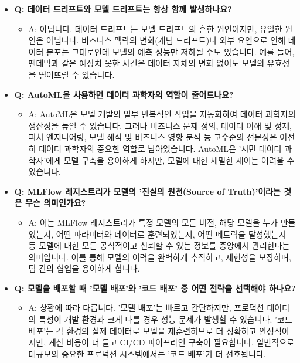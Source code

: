 \documentclass[11pt,a4paper]{article}
\begin{document}
\begin{itemize}
    \item \textbf{Q: 데이터 드리프트와 모델 드리프트는 항상 함께 발생하나요?}
    \begin{itemize}
        \item A: 아닙니다. 데이터 드리프트는 모델 드리프트의 흔한 원인이지만, 유일한 원인은 아닙니다. 비즈니스 맥락의 변화(개념 드리프트)나 외부 요인으로 인해 데이터 분포는 그대로인데 모델의 예측 성능만 저하될 수도 있습니다. 예를 들어, 팬데믹과 같은 예상치 못한 사건은 데이터 자체의 변화 없이도 모델의 유효성을 떨어뜨릴 수 있습니다.
    \end{itemize}

    \item \textbf{Q: AutoML을 사용하면 데이터 과학자의 역할이 줄어드나요?}
    \begin{itemize}
        \item A: AutoML은 모델 개발의 일부 반복적인 작업을 자동화하여 데이터 과학자의 생산성을 높일 수 있습니다. 그러나 비즈니스 문제 정의, 데이터 이해 및 정제, 피처 엔지니어링, 모델 해석 및 비즈니스 영향 분석 등 고수준의 전문성은 여전히 데이터 과학자의 중요한 역할로 남아있습니다. AutoML은 '시민 데이터 과학자'에게 모델 구축을 용이하게 하지만, 모델에 대한 세밀한 제어는 어려울 수 있습니다.
    \end{itemize}

    \item \textbf{Q: MLFlow 레지스트리가 모델의 '진실의 원천(Source of Truth)'이라는 것은 무슨 의미인가요?}
    \begin{itemize}
        \item A: 이는 MLFlow 레지스트리가 특정 모델의 모든 버전, 해당 모델을 누가 만들었는지, 어떤 파라미터와 데이터로 훈련되었는지, 어떤 메트릭을 달성했는지 등 모델에 대한 모든 공식적이고 신뢰할 수 있는 정보를 중앙에서 관리한다는 의미입니다. 이를 통해 모델의 이력을 완벽하게 추적하고, 재현성을 보장하며, 팀 간의 협업을 용이하게 합니다.
    \end{itemize}

    \item \textbf{Q: 모델을 배포할 때 '모델 배포'와 '코드 배포' 중 어떤 전략을 선택해야 하나요?}
    \begin{itemize}
        \item A: 상황에 따라 다릅니다. '모델 배포'는 빠르고 간단하지만, 프로덕션 데이터의 특성이 개발 환경과 크게 다를 경우 성능 문제가 발생할 수 있습니다. '코드 배포'는 각 환경의 실제 데이터로 모델을 재훈련하므로 더 정확하고 안정적이지만, 계산 비용이 더 들고 CI/CD 파이프라인 구축이 필요합니다. 일반적으로 대규모의 중요한 프로덕션 시스템에서는 '코드 배포'가 더 선호됩니다.
    \end{itemize}


\end{itemize}
\end{document}
